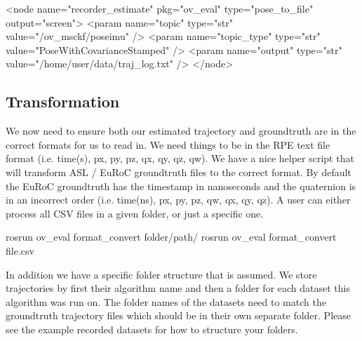 \begin{DoxyCode}
<\textcolor{keywordtype}{node} \textcolor{keyword}{name}=\textcolor{stringliteral}{"recorder\_estimate"} \textcolor{keyword}{pkg}=\textcolor{stringliteral}{"ov\_eval"} \textcolor{keyword}{type}=\textcolor{stringliteral}{"pose\_to\_file"} \textcolor{keyword}{output}=\textcolor{stringliteral}{"screen"}>
    <\textcolor{keywordtype}{param} \textcolor{keyword}{name}=\textcolor{stringliteral}{"topic"}      \textcolor{keyword}{type}=\textcolor{stringliteral}{"str"} \textcolor{keyword}{value}=\textcolor{stringliteral}{"/ov\_msckf/poseimu"} />
    <\textcolor{keywordtype}{param} \textcolor{keyword}{name}=\textcolor{stringliteral}{"topic\_type"} \textcolor{keyword}{type}=\textcolor{stringliteral}{"str"} \textcolor{keyword}{value}=\textcolor{stringliteral}{"PoseWithCovarianceStamped"} />
    <\textcolor{keywordtype}{param} \textcolor{keyword}{name}=\textcolor{stringliteral}{"output"}     \textcolor{keyword}{type}=\textcolor{stringliteral}{"str"} \textcolor{keyword}{value}=\textcolor{stringliteral}{"/home/user/data/traj\_log.txt"} />
</\textcolor{keywordtype}{node}>
\end{DoxyCode}
\hypertarget{eval-error_eval-ov-transform}{}\subsection{Transformation}\label{eval-error_eval-ov-transform}
We now need to ensure both our estimated trajectory and groundtruth are in the correct formats for us to read in. We need things to be in the R\+PE text file format (i.\+e. time(s), px, py, pz, qx, qy, qz, qw). We have a nice helper script that will transform A\+SL / Eu\+RoC groundtruth files to the correct format. By default the Eu\+RoC groundtruth has the timestamp in nanoseconds and the quaternion is in an incorrect order (i.\+e. time(ns), px, py, pz, qw, qx, qy, qz). A user can either process all C\+SV files in a given folder, or just a specific one.


\begin{DoxyCode}
rosrun ov\_eval format\_convert folder/path/
rosrun ov\_eval format\_convert file.csv
\end{DoxyCode}


In addition we have a specific folder structure that is assumed. We store trajectories by first their algorithm name and then a folder for each dataset this algorithm was run on. The folder names of the datasets need to match the groundtruth trajectory files which should be in their own separate folder. Please see the example recorded datasets for how to structure your folders.



